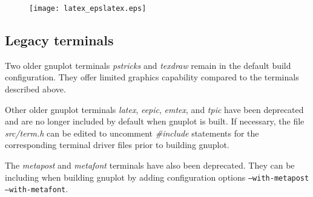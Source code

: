 \documentclass[letterpaper,11pt]{article}
\begin{document}
\begin{figure}[H]
   \centering
   \texttt{[image: latex\_epslatex.eps]}
\end{figure}


\subsection*{Legacy terminals}

Two older gnuplot terminals {\em pstricks} and {\em texdraw} remain in the
default build configuration.  They offer limited graphics capability
compared to the terminals described above.

Other older gnuplot terminals {\em latex}, {\em eepic}, {\em emtex}, and {\em tpic}
have been deprecated and are no longer included by default when gnuplot is built.
If necessary, the file {\em src/term.h} can be edited to uncomment {\em \#include}
statements for the corresponding terminal driver files prior to building gnuplot.

The {\em metapost} and {\em metafont} terminals have also been deprecated.
They can be including when building gnuplot by adding configuration options
{\tt --with-metapost --with-metafont}.
\end{document}
